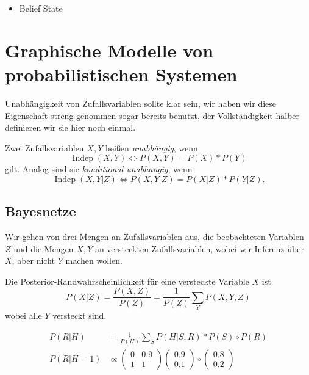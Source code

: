\documentclass[ngerman]{../LaTeX-Templates/Paper/paper}
\newcommand{\independent}{\ensuremath{\operatorname{Indep}}}
\begin{document}
\begin{itemize}
	\item Belief State
\end{itemize}














\section{Graphische Modelle von probabilistischen Systemen}
Unabhängigkeit von Zufallsvariablen sollte klar sein, wir haben wir diese Eigenschaft streng genommen sogar bereits benutzt, der Vollständigkeit halber definieren wir sie hier noch einmal.
\begin{definition}[Unabhängigkeit]
	Zwei Zufallsvariablen $X,Y$ heißen \emph{unabhängig}, wenn
	\begin{equation*}
		\independent(X,Y)\Longleftrightarrow P(X,Y)=P(X)*P(Y)
	\end{equation*}
	gilt. Analog sind sie \emph{konditional unabhängig}, wenn
	\begin{equation*}
		\independent(X,Y|Z)\Longleftrightarrow P(X,Y|Z)=P(X|Z)*P(Y|Z).
	\end{equation*}
\end{definition}








\subsection{Bayesnetze}
Wir gehen von drei Mengen an Zufallsvariablen aus, die beobachteten Variablen $Z$ und die Mengen $X,Y$ an versteckten Zufallsvariablen, wobei wir Inferenz über $X$, aber nicht $Y$ machen wollen.

Die Posterior-Randwahrscheinlichkeit für eine versteckte Variable $X$ ist
\begin{equation*}
	P(X|Z)=\frac{P(X,Z)}{P(Z)}=\frac{1}{P(Z)}\sum_{Y}P(X,Y,Z)
\end{equation*}
wobei alle $Y$ versteckt sind.




\begin{align*}
	P(R|H)&=\frac{1}{P(H)}\sum_SP(H|S,R)*P(S)\circ P(R)\\
	P(R|H=1)&\propto 
	\begin{pmatrix}
		0&0.9\\1&1
	\end{pmatrix}\begin{pmatrix}
		0.9\\0.1
	\end{pmatrix}\circ\begin{pmatrix}
		0.8\\0.2
	\end{pmatrix}
\end{align*}
\end{document}
